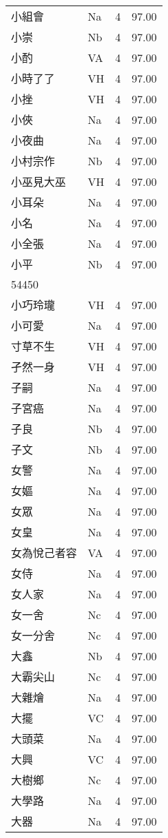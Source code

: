 \documentclass[twocolumn]{book}
\begin{document}
\begin{supertabular}{llrr}
小組會 & Na & 4 &  97.00\\
小崇 & Nb & 4 &  97.00\\
小酌 & VA & 4 &  97.00\\
小時了了 & VH & 4 &  97.00\\
小挫 & VH & 4 &  97.00\\
小俠 & Na & 4 &  97.00\\
小夜曲 & Na & 4 &  97.00\\
小村宗作 & Nb & 4 &  97.00\\
小巫見大巫 & VH & 4 &  97.00\\
小耳朵 & Na & 4 &  97.00\\
小名 & Na & 4 &  97.00\\
小全張 & Na & 4 &  97.00\\
小平 & Nb & 4 &  97.00\\
54450\\
小巧玲瓏 & VH & 4 &  97.00\\
小可愛 & Na & 4 &  97.00\\
寸草不生 & VH & 4 &  97.00\\
孑然一身 & VH & 4 &  97.00\\
子嗣 & Na & 4 &  97.00\\
子宮癌 & Na & 4 &  97.00\\
子良 & Nb & 4 &  97.00\\
子文 & Nb & 4 &  97.00\\
女警 & Na & 4 &  97.00\\
女嫗 & Na & 4 &  97.00\\
女眾 & Na & 4 &  97.00\\
女皇 & Na & 4 &  97.00\\
女為悅己者容 & VA & 4 &  97.00\\
女侍 & Na & 4 &  97.00\\
女人家 & Na & 4 &  97.00\\
女一舍 & Nc & 4 &  97.00\\
女一分舍 & Nc & 4 &  97.00\\
大鑫 & Nb & 4 &  97.00\\
大霸尖山 & Nc & 4 &  97.00\\
大雜燴 & Na & 4 &  97.00\\
大擺 & VC & 4 &  97.00\\
大頭菜 & Na & 4 &  97.00\\
大興 & VC & 4 &  97.00\\
大樹鄉 & Nc & 4 &  97.00\\
大學路 & Na & 4 &  97.00\\
大器 & Na & 4 &  97.00\\

\end{supertabular}
\end{document}
